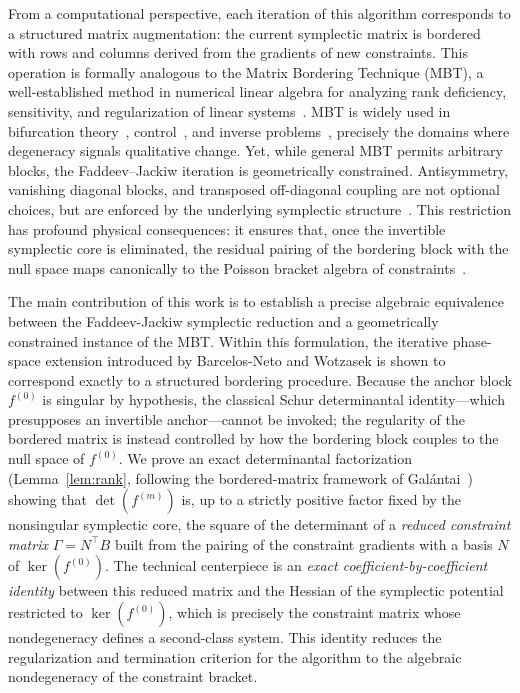 \documentclass[11pt,a4paper]{article}
\begin{document}
	From a computational perspective, each iteration of this algorithm corresponds to a structured matrix augmentation: the current symplectic matrix is bordered with rows and columns derived from the gradients of new constraints. This operation is formally analogous to the Matrix Bordering Technique (MBT), a well-established method in numerical linear algebra for analyzing rank deficiency, sensitivity, and regularization of linear systems~\cite{GolubVanLoan2013,StewartSun1990}. MBT is widely used in bifurcation theory~\cite{Kuznetsov2004,Seydel2010}, control~\cite{ZhouDoyle1998}, and inverse problems~\cite{Vogel2002}, precisely the domains where degeneracy signals qualitative change. Yet, while general MBT permits arbitrary blocks, the Faddeev–Jackiw iteration is geometrically constrained.
	Antisymmetry, vanishing diagonal blocks, and transposed off-diagonal coupling are not optional choices, but are enforced by the underlying symplectic structure~\cite{ArnoldBook,Marsden1999,AbrahamMarsden1978}. This restriction has profound physical consequences: it ensures that, once the invertible symplectic core is eliminated, the residual pairing of the bordering block with the null space maps canonically to the Poisson bracket algebra of constraints~\cite{Dirac1964,Henneaux1992}.
	
	
	
	The main contribution of this work is to establish a precise algebraic equivalence between the Faddeev-Jackiw symplectic reduction and a geometrically constrained instance of the MBT. Within this formulation, the iterative phase-space extension introduced by Barcelos-Neto and Wotzasek is shown to correspond exactly to a structured bordering procedure. Because the anchor block $f^{(0)}$ is singular by hypothesis, the classical Schur determinantal identity---which presupposes an invertible anchor---cannot be invoked; the regularity of the bordered matrix is instead controlled by how the bordering block couples to the null space of $f^{(0)}$. We prove an exact determinantal factorization (Lemma~\ref{lem:rank}, following the bordered-matrix framework of Galántai~\cite{Galantai2001}) showing that $\det(f^{(m)})$ is, up to a strictly positive factor fixed by the nonsingular symplectic core, the square of the determinant of a \emph{reduced constraint matrix} $\Gamma = N^{\top}B$ built from the pairing of the constraint gradients with a basis $N$ of $\ker(f^{(0)})$. The technical centerpiece is an \emph{exact coefficient-by-coefficient identity} between this reduced matrix and the Hessian of the symplectic potential restricted to $\ker(f^{(0)})$, which is precisely the constraint matrix whose nondegeneracy defines a second-class system. This identity reduces the regularization and termination criterion for the algorithm to the algebraic nondegeneracy of the constraint bracket.
	
\end{document}
